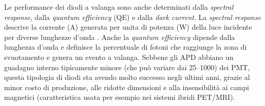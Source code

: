 Le performance dei diodi a valanga sono anche determinati dalla \textit{spectral response}, dalla \textit{quantum efficiency} (QE) e dalla \textit{dark current}. La \textit{spectral response} descrive la corrente (A) generata per unita di potenza (W) della luce incidente per diverse lunghezze d'onda \cite{Jiang2019}. Anche la \textit{quantum efficiency} dipende dalla lunghezza d'onda e definisce la percentuale di fotoni che raggiunge la zona di svuotamento e genera un evento a valanga. Sebbene gli APD abbiano un guadagno interno tipicamente minore (che può variare dai \numrange[range-phrase=--]{25}{1000}) dei PMT, questa tipologia di diodi sta avendo molto successo negli ultimi anni, grazie al minor costo di produzione, alle ridotte dimensioni e alla insensibilità ai campi magnetici (caratteristica usata per esempio nei sistemi ibridi PET/MRI).

\clearpage
